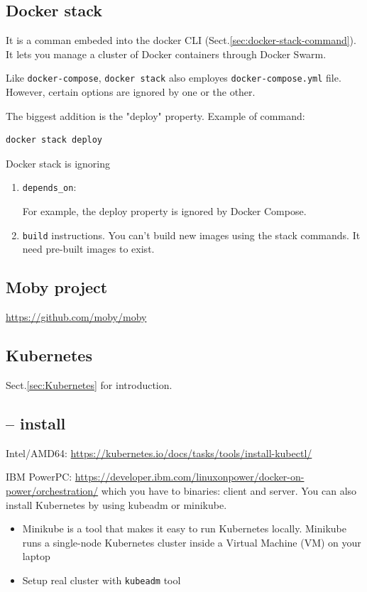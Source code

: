 \subsection{Docker stack}
\label{sec:Docker-stack}

It is a comman embeded into the docker CLI (Sect.\ref{sec:docker-stack-command}).
It lets you manage a cluster of Docker containers through Docker Swarm.

Like \verb!docker-compose!, \verb!docker stack! also employes \verb!docker-compose.yml! file.
However, certain options are ignored by one or the other.

The biggest addition is the "deploy" property. Example of command:
\begin{verbatim}
docker stack deploy
\end{verbatim}


Docker stack is ignoring

\begin{enumerate}
  \item  \verb!depends_on!:
  
  For example, the deploy property is ignored by Docker Compose.
  
  \item \verb!build! instructions. You can’t build new images using
the stack commands. It need pre-built images to exist.
  
\end{enumerate}

\subsection{Moby project}

\url{https://github.com/moby/moby}


\subsection{Kubernetes}
\label{sec:Kubernetes-details}

Sect.\ref{sec:Kubernetes} for introduction.

\subsection{-- install }

Intel/AMD64: 
\url{https://kubernetes.io/docs/tasks/tools/install-kubectl/}


IBM PowerPC: 
\url{https://developer.ibm.com/linuxonpower/docker-on-power/orchestration/}
which you have to binaries: client and server.
You can also install Kubernetes by using kubeadm or minikube.
\begin{itemize}
  
  \item Minikube is a tool that makes it easy to run Kubernetes locally.
  Minikube runs a single-node Kubernetes cluster inside a Virtual Machine (VM)
  on your laptop
  
  \item Setup real cluster with \verb!kubeadm! tool
\end{itemize}

